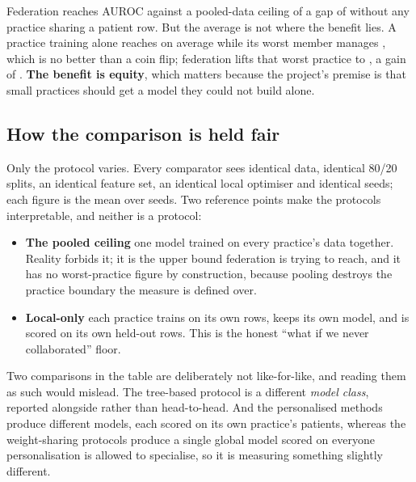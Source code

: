 \label{sec:works}
\statusMeasured

\begin{shortanswer}
Federation reaches \BestFedAUC{} AUROC against a pooled-data ceiling of \CeilingAUC{} a gap of
\CeilingGapAbs{} without any practice sharing a patient row. But the average is not where the
benefit lies. A practice training alone reaches \LocalAUC{} on average while its worst member
manages \LocalWorst{}, which is no better than a coin flip; federation lifts that worst practice to
\BestFedWorst{}, a gain of \WorstGain{}. \textbf{The benefit is equity}, which
matters because the project's premise is that small practices should get a model they could not
build alone.
\end{shortanswer}

\subsection{How the comparison is held fair}

Only the protocol varies. Every comparator sees identical data, identical 80/20 splits, an identical
feature set, an identical local optimiser and identical seeds; each figure is the mean over
\NumSeeds{} seeds. Two reference points make the protocols interpretable, and neither is a protocol:

\begin{itemize}
  \item \textbf{The pooled ceiling} one model trained on every practice's data together. Reality
        forbids it; it is the upper bound federation is trying to reach, and it has no
        worst-practice figure by construction, because pooling destroys the practice boundary the
        measure is defined over.
  \item \textbf{Local-only} each practice trains on its own rows, keeps its own model, and is
        scored on its own held-out rows. This is the honest ``what if we never collaborated'' floor.
\end{itemize}

Two comparisons in the table are deliberately not like-for-like, and reading them as such would
mislead. The tree-based protocol is a different \emph{model class}, reported alongside rather than
head-to-head. And the personalised methods produce \NumPractices{} different models, each scored on
its own practice's patients, whereas the weight-sharing protocols produce a single global model
scored on everyone personalisation is allowed to specialise, so it is measuring something
slightly different.

